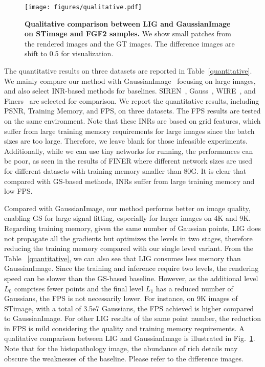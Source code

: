 \begin{figure*}[t]
\centering
\texttt{[image: figures/qualitative.pdf]}
\caption{\textbf{Qualitative comparison between LIG and GaussianImage on STimage and FGF2 samples.} We show small patches from the rendered images and the GT images. The difference images are shift to 0.5 for visualization.} 
\label{qualitative}
\end{figure*}

The quantitative results on three datasets are reported in Table~\ref{quantitative}.
We mainly compare our method with GaussianImage~\cite{zhang2024gaussianimage} focusing on large images, and also select INR-based methods for baselines. SIREN~\cite{sitzmann2020implicit}, Gauss~\cite{ramasinghe2022beyond}, WIRE~\cite{saragadam2023wire}, and Finers~\cite{liu2024finer} are selected for comparison. We report the quantitative results, including PSNR, Training Memory, and FPS, on three datasets. The FPS results are tested on the same environment. Note that these INRs are based on grid features, which suffer from large training memory requirements for large images since the batch sizes are too large. Therefore, we leave blank for those infeasible experiments. Additionally, while we can use tiny networks for running, the performances can be poor, as seen in the results of FINER where different network sizes are used for different datasets with training memory smaller than 80G. It is clear that compared with GS-based methods, INRs suffer from large training memory and low FPS.

Compared with GaussianImage, our method performs better on image quality, enabling GS for large signal fitting, especially for larger images on 4K and 9K. Regarding training memory, given the same number of Gaussian points, LIG does not propagate all the gradients but optimizes the levels in two stages, therefore reducing the training memory compared with our single level variant. From the Table ~\ref{quantitative}, we can also see that LIG consumes less memory than GaussianImage. Since the training and inference require two levels, the rendering speed can be slower than the GS-based baseline. However, as the additional level $L_0$ comprises fewer points and the final level $L_1$ has a reduced number of Gaussians, the FPS is not necessarily lower. For instance, on 9K images of STimage, with a total of 3.5e7 Gaussians, the FPS achieved is higher compared to GaussianImage. For other LIG results of the same point number, the reduction in FPS is mild considering the quality and training memory requirements. A qualitative comparison between LIG and GaussianImage is illustrated in Fig.~\ref{qualitative}. Note that for the histopathology image, the abundance of rich details may obscure the weaknesses of the baseline. Please refer to the difference images.


